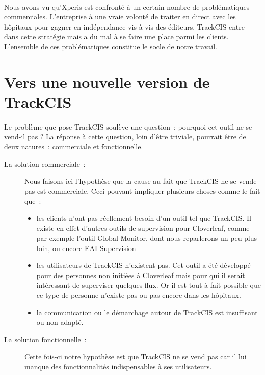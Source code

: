 	\paragraph{}
	Nous avons vu qu'Xperis est confronté à un certain nombre de problématiques
	commerciales. L'entreprise à une vraie volonté de traiter en direct avec les
	hôpitaux pour gagner en indépendance vis à vis des éditeurs. TrackCIS entre
	dans cette stratégie mais a du mal à se faire une place parmi les
	clients.\newline
	L'ensemble de ces problématiques constitue le socle de notre travail.
	
	\section{Vers une nouvelle version de TrackCIS}
		\paragraph{}%
		Le problème que pose TrackCIS soulève une question~: pourquoi cet outil ne se
		vend-il pas ? La réponse à cette question, loin d'être triviale, pourrait
		être de deux natures~: commerciale et fonctionnelle.
		\begin{description}
			\item[La solution commerciale~: ] Nous faisons ici l'hypothèse que la cause
			au fait que TrackCIS ne se vende pas est commerciale. Ceci pouvant impliquer
			plusieurs choses comme le fait que~:
			\begin{itemize}
			  \item les clients n'ont pas réellement besoin d'un outil tel que TrackCIS.
			  Il existe en effet d'autres outils de supervision pour Cloverleaf, comme
			  par exemple l'outil Global Monitor, dont nous reparlerons un peu plus
			  loin, ou encore EAI Supervision
			  \item les utilisateurs de TrackCIS n'existent pas. Cet outil a été
			  développé pour des personnes non initiées à Cloverleaf mais pour qui
			  il serait intéressant de superviser quelques flux.
			  Or il est tout à fait possible que ce type de personne n'existe pas ou pas
			  encore dans les hôpitaux.
			  \item la communication ou le démarchage autour de TrackCIS est insuffisant
			  ou non adapté.
			\end{itemize}
			\item[La solution fonctionnelle~: ] Cette fois-ci notre hypothèse est que
			TrackCIS ne se vend pas car il lui manque des fonctionnalités indispensables
			à ses utilisateurs.
		\end{description}
		
